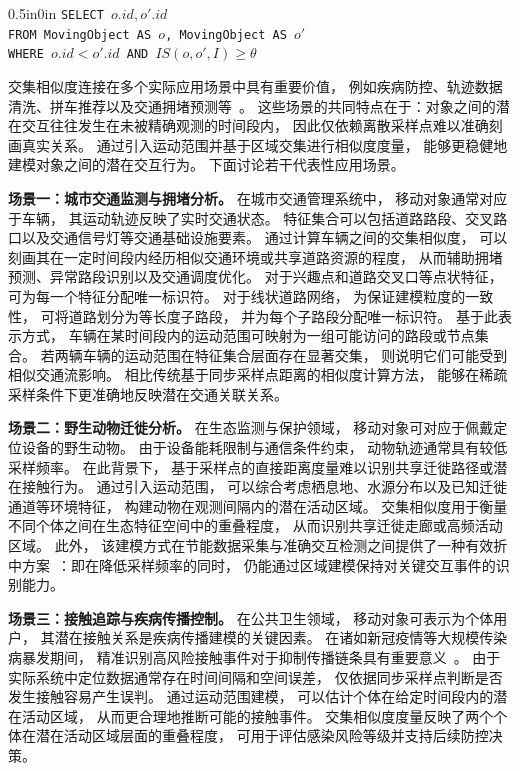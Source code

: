 \begin{adjustwidth}{0.5in}{0in} \texttt{SELECT $o.id, o'.id$\\ FROM MovingObject AS $o$, MovingObject AS $o'$\\ WHERE $o.id<o'.id$ AND $IS(o,o',I) \geq \theta$} \end{adjustwidth}




交集相似度连接在多个实际应用场景中具有重要价值， 例如疾病防控、轨迹数据清洗、拼车推荐以及交通拥堵预测等~。 这些场景的共同特点在于：对象之间的潜在交互往往发生在未被精确观测的时间段内， 因此仅依赖离散采样点难以准确刻画真实关系。 通过引入运动范围并基于区域交集进行相似度度量， 能够更稳健地建模对象之间的潜在交互行为。 下面讨论若干代表性应用场景。

\noindent\textbf{场景一：城市交通监测与拥堵分析。 }
在城市交通管理系统中， 移动对象通常对应于车辆， 其运动轨迹反映了实时交通状态。 特征集合可以包括道路路段、交叉路口以及交通信号灯等交通基础设施要素。 通过计算车辆之间的交集相似度， 可以刻画其在一定时间段内经历相似交通环境或共享道路资源的程度， 从而辅助拥堵预测、异常路段识别以及交通调度优化。 对于兴趣点和道路交叉口等点状特征， 可为每一个特征分配唯一标识符。 对于线状道路网络， 为保证建模粒度的一致性， 可将道路划分为等长度子路段， 并为每个子路段分配唯一标识符。 基于此表示方式， 车辆在某时间段内的运动范围可映射为一组可能访问的路段或节点集合。 若两辆车辆的运动范围在特征集合层面存在显著交集， 则说明它们可能受到相似交通流影响。 相比传统基于同步采样点距离的相似度计算方法， 能够在稀疏采样条件下更准确地反映潜在交通关联关系。

\noindent\textbf{场景二：野生动物迁徙分析。}
在生态监测与保护领域， 移动对象可对应于佩戴定位设备的野生动物。 由于设备能耗限制与通信条件约束， 动物轨迹通常具有较低采样频率。 在此背景下， 基于采样点的直接距离度量难以识别共享迁徙路径或潜在接触行为。 通过引入运动范围， 可以综合考虑栖息地、水源分布以及已知迁徙通道等环境特征， 构建动物在观测间隔内的潜在活动区域。 交集相似度用于衡量不同个体之间在生态特征空间中的重叠程度， 从而识别共享迁徙走廊或高频活动区域。 此外， 该建模方式在节能数据采集与准确交互检测之间提供了一种有效折中方案~：即在降低采样频率的同时， 仍能通过区域建模保持对关键交互事件的识别能力。

\noindent\textbf{场景三：接触追踪与疾病传播控制。}
在公共卫生领域， 移动对象可表示为个体用户， 其潜在接触关系是疾病传播建模的关键因素。 在诸如新冠疫情等大规模传染病暴发期间， 精准识别高风险接触事件对于抑制传播链条具有重要意义~。 由于实际系统中定位数据通常存在时间间隔和空间误差， 仅依据同步采样点判断是否发生接触容易产生误判。 通过运动范围建模， 可以估计个体在给定时间段内的潜在活动区域， 从而更合理地推断可能的接触事件。 交集相似度度量反映了两个个体在潜在活动区域层面的重叠程度， 可用于评估感染风险等级并支持后续防控决策。


